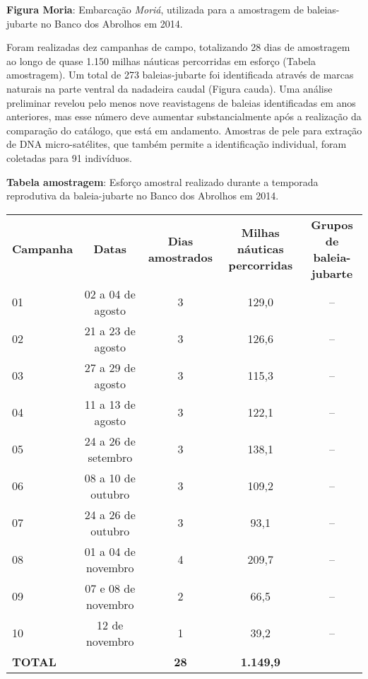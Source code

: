 \textbf{Figura Moria}: Embarcação \textit{Moriá}, utilizada para a amostragem de baleias-jubarte no Banco dos Abrolhos em 2014.

Foram realizadas dez campanhas de campo, totalizando 28 dias de amostragem ao longo de quase 1.150 milhas náuticas percorridas em esforço (Tabela amostragem). Um total de 273 baleias-jubarte foi identificada através de marcas naturais na parte ventral da nadadeira caudal (Figura cauda). Uma análise preliminar revelou pelo menos nove reavistagens de baleias identificadas em anos anteriores, mas esse número deve aumentar substancialmente após a realização da comparação do catálogo, que está em andamento. Amostras de pele para extração de DNA micro-satélites, que também permite a identificação individual, foram coletadas para 91 indivíduos.

\textbf{Tabela amostragem}: Esforço amostral realizado durante a temporada reprodutiva da baleia-jubarte no Banco dos Abrolhos em 2014.  

\begin{tabular}{lcccc}  
\textbf{Campanha} & \textbf{Datas} & \textbf{Dias amostrados} & \textbf{Milhas náuticas percorridas} & \textbf{Grupos de baleia-jubarte} \\
01 & 02 a 04 de agosto & 3 & 129,0 & -- \\
02 & 21 a 23 de agosto & 3 & 126,6 & -- \\
03 & 27 a 29 de agosto & 3 & 115,3 & -- \\
04 & 11 a 13 de agosto & 3 & 122,1 & -- \\
05 & 24 a 26 de setembro & 3 & 138,1 & -- \\
06 & 08 a 10 de outubro & 3 & 109,2 & -- \\
07 & 24 a 26 de outubro & 3 & 93,1 & -- \\
08 & 01 a 04 de novembro & 4 & 209,7 & -- \\
09 & 07 e 08 de novembro & 2 & 66,5 & -- \\
10 & 12 de novembro & 1 & 39,2 & -- \\
\textbf{TOTAL} & & \textbf{28} & \textbf{1.149,9} & \\
\end{tabular}    
